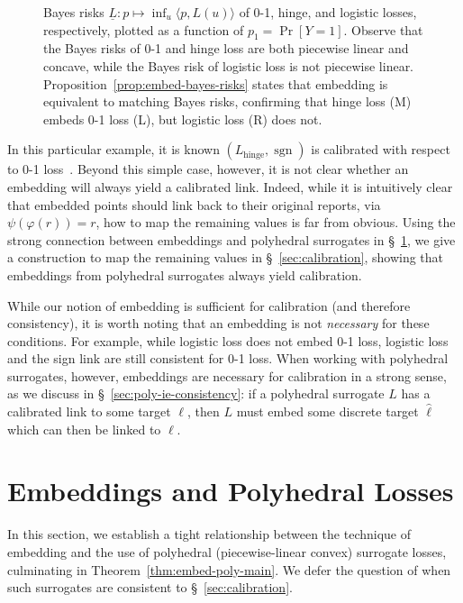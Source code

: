 \documentclass[twoside,11pt]{article}
\newcommand{\risk}[1]{\underline{#1}}
\newcommand{\inprod}[2]{\langle #1, #2 \rangle}%
\newcommand{\hinge}{L_{\mathrm{hinge}}}
\DeclareMathOperator*{\sgn}{sgn}
\begin{document}
\begin{figure}
\begin{minipage}{0.3\linewidth}
\end{minipage}
\caption{Bayes risks $\risk L : p \mapsto \inf_u \inprod{p}{L(u)}$ of 0-1, hinge, and logistic losses, respectively, plotted as a function of $p_1 = \Pr[Y=1]$.
	Observe that the Bayes risks of 0-1 and hinge loss are both piecewise linear and concave, while the Bayes risk of logistic loss is not piecewise linear.  Proposition~\ref{prop:embed-bayes-risks} states that embedding is equivalent to matching Bayes risks, confirming that hinge loss (M) embeds 0-1 loss (L), but logistic loss (R) does not.}
\label{fig:bayes-risks-01}
\end{figure}

In this particular example, it is known $(\hinge,\sgn)$ is calibrated with respect to 0-1 loss~\citep[Example 4]{bartlett2006convexity}.
Beyond this simple case, however, it is not clear whether an embedding will always yield a calibrated link.
Indeed, while it is intuitively clear that embedded points should link back to their original reports, via $\psi(\varphi(r)) = r$, how to map the remaining values is far from obvious.
Using the strong connection between embeddings and polyhedral surrogates in \S~\ref{sec:poly-loss-embed}, we give a construction to map the remaining values in \S~\ref{sec:calibration}, showing that embeddings from polyhedral surrogates always yield calibration.

While our notion of embedding is sufficient for calibration (and therefore consistency), it is worth noting that an embedding is not \emph{necessary} for these conditions.  
For example, while logistic loss does not embed 0-1 loss, logistic loss and the sign link are still consistent for 0-1 loss.
When working with polyhedral surrogates, however, embeddings are necessary for calibration in a strong sense, as we discuss in \S~\ref{sec:poly-ie-consistency}: if a polyhedral surrogate $L$ has a calibrated link to some target $\ell$, then $L$ must embed some discrete target $\hat\ell$ which can then be linked to $\ell$.



\section{Embeddings and Polyhedral Losses}
\label{sec:poly-loss-embed}

In this section, we establish a tight relationship between the technique of embedding and the use of polyhedral (piecewise-linear convex) surrogate losses, culminating in Theorem~\ref{thm:embed-poly-main}.
We defer the question of when such surrogates are consistent to \S~\ref{sec:calibration}. 
\end{document}
